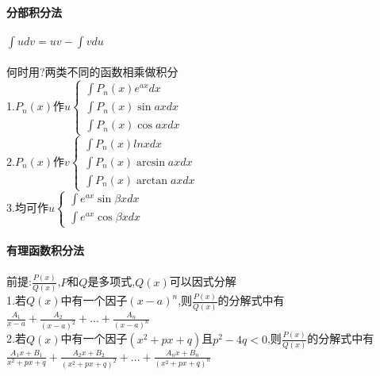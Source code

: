 \documentclass{article}
\begin{document}
\begin{flushleft}
	~\\ \textbf{分部积分法} \\~\\
	
	$\int udv=uv-\int vdu$\\
	~\\
	何时用?两类不同的函数相乘做积分\\
	1.$P_n(x)$作$u \left\{
	\begin{array}{lcl}
	\int P_n(x)e^{ax}dx\\
	\int P_n(x)\sin axdx\\
	\int P_n(x)\cos axdx
	\end{array} \right.$\\
	2.$P_n(x)$作$v \left\{
	\begin{array}{lcl}
	\int P_n(x)lnxdx\\
	\int P_n(x)\arcsin axdx\\
	\int P_n(x)\arctan axdx
	\end{array} \right.$\\
	3.均可作$u \left\{
	\begin{array}{lcl}
	\int e^{ax}\sin \beta xdx\\
	\int e^{ax}\cos \beta xdx
	\end{array} \right.$\\
	
	~\\ \textbf{有理函数积分法} \\~\\
	
	前提:$\frac{P(x)}{Q(x)}$,$P$和$Q$是多项式,$Q(x)$可以因式分解\\
	1.若$Q(x)$中有一个因子$(x-a)^n$,则$\frac{P(x)}{Q(x)}$的分解式中有$\frac{A_1}{x-a}+\frac{A_2}{(x-a)^2}+...+\frac{A_n}{(x-a)^n}$\\
	2.若$Q(x)$中有一个因子$(x^2+px+q)$且$p^2-4q<0$,则$\frac{P(x)}{Q(x)}$的分解式中有$\frac{A_1x+B_1}{x^2+px+q}+\frac{A_2x+B_2}{(x^2+px+q)^2}+...+\frac{A_nx+B_n}{(x^2+px+q)^n}$\\
\end{flushleft}
\end{document}
